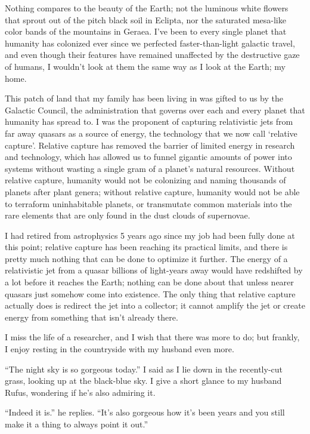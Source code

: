 \documentclass{book}
\begin{document}
			Nothing compares to the beauty of the Earth; not the luminous white flowers that sprout
			out of the pitch black soil in Eclipta, nor the saturated mesa-like color bands of the
			mountains in Geraea. I've been to every single planet that humanity has colonized ever
			since we perfected faster-than-light galactic travel, and even though their features
			have remained unaffected by the destructive gaze of humans, I wouldn't look at them the
			same way as I look at the Earth; my home.

			This patch of land that my family has been living in was gifted to us by the Galactic
			Council, the administration that governs over each and every planet that humanity has
			spread to. I was the proponent of capturing relativistic jets from far away quasars as
			a source of energy, the technology that we now call `relative capture'. Relative
			capture has removed the barrier of limited energy in research and technology, which has
			allowed us to funnel gigantic amounts of power into systems without wasting a single
			gram of a planet's natural resources. Without relative capture, humanity would not be
			colonizing and naming thousands of planets after plant genera; without relative
			capture, humanity would not be able to terraform uninhabitable planets, or transmutate
			common materials into the rare elements that are only found in the dust clouds of
			supernovae.

			I had retired from astrophysics 5 years ago since my job had been fully done at this
			point; relative capture has been reaching its practical limits, and there is pretty
			much nothing that can be done to optimize it further. The energy of a relativistic jet
			from a quasar billions of light-years away would have redshifted by a lot before it
			reaches the Earth; nothing can be done about that unless nearer quasars just somehow
			come into existence. The only thing that relative capture actually does is redirect the
			jet into a collector; it cannot amplify the jet or create energy from something that
			isn't already there.

			I miss the life of a researcher, and I wish that there was more to do; but frankly, I
			enjoy resting in the countryside with my husband even more.

			``The night sky is so gorgeous today.'' I said as I lie down in the recently-cut grass,
			looking up at the black-blue sky. I give a short glance to my husband Rufus, wondering
			if he's also admiring it.

			``Indeed it is.'' he replies. ``It's also gorgeous how it's been years and you still
			make it a thing to always point it out.''
\end{document}
